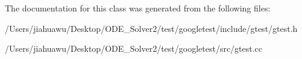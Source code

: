 The documentation for this class was generated from the following files\+:\begin{DoxyCompactItemize}
\item 
/\+Users/jiahuawu/\+Desktop/\+O\+D\+E\+\_\+\+Solver2/test/googletest/include/gtest/gtest.\+h\item 
/\+Users/jiahuawu/\+Desktop/\+O\+D\+E\+\_\+\+Solver2/test/googletest/src/gtest.\+cc\end{DoxyCompactItemize}
